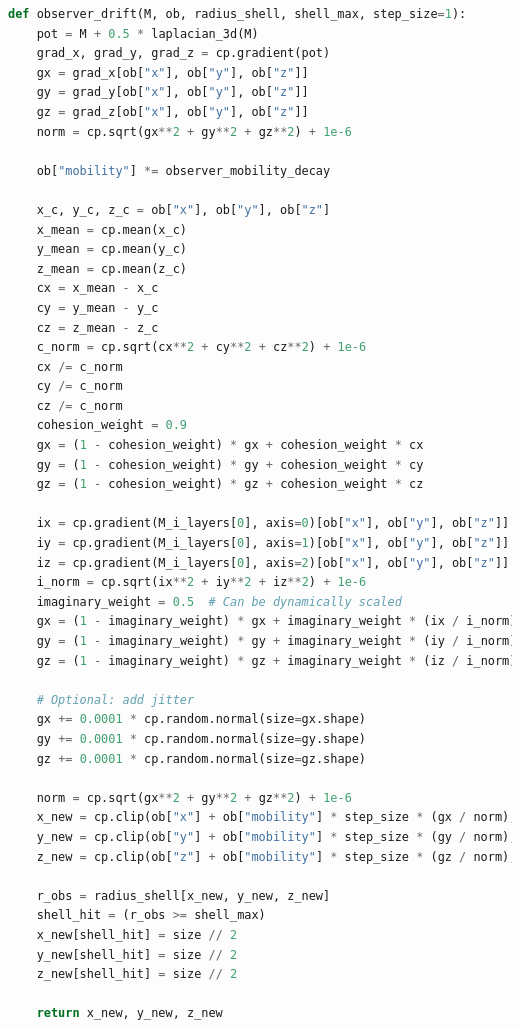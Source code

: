 \begin{lstlisting}[language=Python]
def observer_drift(M, ob, radius_shell, shell_max, step_size=1):
    pot = M + 0.5 * laplacian_3d(M)
    grad_x, grad_y, grad_z = cp.gradient(pot)
    gx = grad_x[ob["x"], ob["y"], ob["z"]]
    gy = grad_y[ob["x"], ob["y"], ob["z"]]
    gz = grad_z[ob["x"], ob["y"], ob["z"]]
    norm = cp.sqrt(gx**2 + gy**2 + gz**2) + 1e-6

    ob["mobility"] *= observer_mobility_decay

    x_c, y_c, z_c = ob["x"], ob["y"], ob["z"]
    x_mean = cp.mean(x_c)
    y_mean = cp.mean(y_c)
    z_mean = cp.mean(z_c)
    cx = x_mean - x_c
    cy = y_mean - y_c
    cz = z_mean - z_c
    c_norm = cp.sqrt(cx**2 + cy**2 + cz**2) + 1e-6
    cx /= c_norm
    cy /= c_norm
    cz /= c_norm
    cohesion_weight = 0.9
    gx = (1 - cohesion_weight) * gx + cohesion_weight * cx
    gy = (1 - cohesion_weight) * gy + cohesion_weight * cy
    gz = (1 - cohesion_weight) * gz + cohesion_weight * cz

    ix = cp.gradient(M_i_layers[0], axis=0)[ob["x"], ob["y"], ob["z"]]
    iy = cp.gradient(M_i_layers[0], axis=1)[ob["x"], ob["y"], ob["z"]]
    iz = cp.gradient(M_i_layers[0], axis=2)[ob["x"], ob["y"], ob["z"]]
    i_norm = cp.sqrt(ix**2 + iy**2 + iz**2) + 1e-6
    imaginary_weight = 0.5  # Can be dynamically scaled
    gx = (1 - imaginary_weight) * gx + imaginary_weight * (ix / i_norm)
    gy = (1 - imaginary_weight) * gy + imaginary_weight * (iy / i_norm)
    gz = (1 - imaginary_weight) * gz + imaginary_weight * (iz / i_norm)

    # Optional: add jitter
    gx += 0.0001 * cp.random.normal(size=gx.shape)
    gy += 0.0001 * cp.random.normal(size=gy.shape)
    gz += 0.0001 * cp.random.normal(size=gz.shape)

    norm = cp.sqrt(gx**2 + gy**2 + gz**2) + 1e-6
    x_new = cp.clip(ob["x"] + ob["mobility"] * step_size * (gx / norm), 0, size - 1).astype(cp.int32)
    y_new = cp.clip(ob["y"] + ob["mobility"] * step_size * (gy / norm), 0, size - 1).astype(cp.int32)
    z_new = cp.clip(ob["z"] + ob["mobility"] * step_size * (gz / norm), 0, size - 1).astype(cp.int32)

    r_obs = radius_shell[x_new, y_new, z_new]
    shell_hit = (r_obs >= shell_max)
    x_new[shell_hit] = size // 2
    y_new[shell_hit] = size // 2
    z_new[shell_hit] = size // 2

    return x_new, y_new, z_new
\end{lstlisting}



